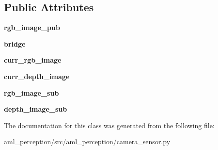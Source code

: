 \subsection*{Public Attributes}
\begin{DoxyCompactItemize}
\item 
\hypertarget{classaml__perception_1_1camera__sensor_1_1_camera_sensor_af2ce3908d0143e32e9bc38d087440873}{}\label{classaml__perception_1_1camera__sensor_1_1_camera_sensor_af2ce3908d0143e32e9bc38d087440873} 
{\bfseries rgb\+\_\+image\+\_\+pub}
\item 
\hypertarget{classaml__perception_1_1camera__sensor_1_1_camera_sensor_afbcaffd62e78201a936cf5d60006bcff}{}\label{classaml__perception_1_1camera__sensor_1_1_camera_sensor_afbcaffd62e78201a936cf5d60006bcff} 
{\bfseries bridge}
\item 
\hypertarget{classaml__perception_1_1camera__sensor_1_1_camera_sensor_a1871c9264c19f303b86da984c4030c80}{}\label{classaml__perception_1_1camera__sensor_1_1_camera_sensor_a1871c9264c19f303b86da984c4030c80} 
{\bfseries curr\+\_\+rgb\+\_\+image}
\item 
\hypertarget{classaml__perception_1_1camera__sensor_1_1_camera_sensor_a24bac5456b53e28f770ce91c2f4699e6}{}\label{classaml__perception_1_1camera__sensor_1_1_camera_sensor_a24bac5456b53e28f770ce91c2f4699e6} 
{\bfseries curr\+\_\+depth\+\_\+image}
\item 
\hypertarget{classaml__perception_1_1camera__sensor_1_1_camera_sensor_abe4b029d9dbaece5072fecd7bf5499d4}{}\label{classaml__perception_1_1camera__sensor_1_1_camera_sensor_abe4b029d9dbaece5072fecd7bf5499d4} 
{\bfseries rgb\+\_\+image\+\_\+sub}
\item 
\hypertarget{classaml__perception_1_1camera__sensor_1_1_camera_sensor_a9efa156e292a81961d991f23434ad86d}{}\label{classaml__perception_1_1camera__sensor_1_1_camera_sensor_a9efa156e292a81961d991f23434ad86d} 
{\bfseries depth\+\_\+image\+\_\+sub}
\end{DoxyCompactItemize}


The documentation for this class was generated from the following file\+:\begin{DoxyCompactItemize}
\item 
aml\+\_\+perception/src/aml\+\_\+perception/camera\+\_\+sensor.\+py\end{DoxyCompactItemize}
